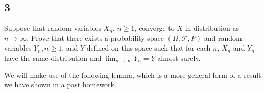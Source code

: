 \documentclass[12pt]{article}
\begin{document}

\newpage
\subsection*{3}
\begin{tcolorbox}
  Suppose that random variables $X_n$, $n \geq 1$, converge to $X$ in distribution as $n \rightarrow \infty$. Prove that there exists a probability space $(\Omega, \mathcal{F}, P)$ and random variables $Y_n, n \geq 1$, and $Y$ defined on this space such that for each $n$, $X_n$ and $Y_n$ have the same distribution and $\lim_{n\rightarrow\infty} Y_n = Y$ almost surely.
\end{tcolorbox}

We will make use of the following lemma, which is a more general form of a result we have shown in a past homework. \\
\end{document}
